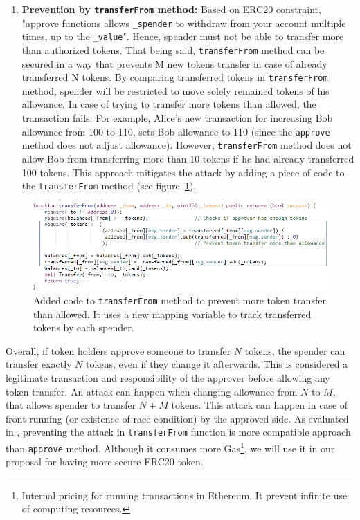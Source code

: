 \begin{enumerate}
	\item \textbf{Prevention by \texttt{transferFrom} method:} Based on ERC20 constraint, "approve functions allows \texttt{\_spender} to withdraw from your account multiple times, up to the \texttt{\_value}". Hence, spender must not be able to transfer more than authorized tokens. That being said, \texttt{transferFrom} method can be secured in a way that prevents M new tokens transfer in case of already transferred N tokens. By comparing transferred tokens in \texttt{transferFrom} method, spender will be restricted to move solely remained tokens of his allowance. In case of trying to transfer more tokens than allowed, the transaction fails. For example, Alice's new transaction for increasing Bob allowance from 100 to 110, sets Bob allowance to 110 (since the \texttt{approve} method does not adjust allowance). However, \texttt{transferFrom} method does not allow Bob from transferring more than 10 tokens if he had already transferred 100 tokens. This approach  mitigates the attack by adding a piece of code to the \texttt{transferFrom} method (see figure~\ref{fig:mwapre}).
\end{enumerate}

\begin{figure}[t]
	\centering
	\includegraphics[width=0.9\linewidth]{figures/img15.png}
	\caption{Added code to \texttt{transferFrom} method to prevent more token transfer than allowed. It uses a new mapping variable to track transferred tokens by each spender. }
	\label{fig:mwapre}
\end{figure}

Overall, if token holders approve someone to transfer $N$ tokens, the spender can transfer exactly $N$ tokens, even if they change it afterwards. This is considered a legitimate transaction and responsibility of the approver before allowing any token transfer. An attack can happen when changing allowance from $N$ to $M$, that allows spender to transfer $N+M$ tokens. This attack can happen in case of front-running (or existence of race condition) by the approved side. As evaluated in \cite{ERC20MWA}, preventing the attack in \texttt{transferFrom} function is more compatible approach than \texttt{approve} method. Although it consumes more Gas\footnote{Internal pricing for running transactions in Ethereum. It prevent infinite use of computing resources.}, we will use it in our proposal for having more secure ERC20 token.